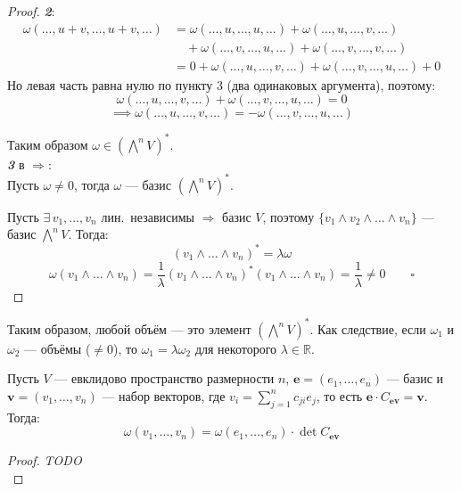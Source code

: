 \begin{stmt}
\begin{proof}
        \textbf{\emph{2}}:
        \begin{align*}
            \omega(\dots, u+v, \dots, u+v, \dots)
            &= \omega(\dots, u, \dots, u, \dots)
            + \omega(\dots, u, \dots, v, \dots) \\
            &\quad + \omega(\dots, v, \dots, u, \dots)
            + \omega(\dots, v, \dots, v, \dots) \\
            &= 0 + \omega(\dots, u, \dots, v, \dots)
            + \omega(\dots, v, \dots, u, \dots) + 0
        \end{align*}
        Но левая часть равна нулю по пункту 3 (два одинаковых аргумента), поэтому:
        \[
            \omega(\dots, u, \dots, v, \dots) + \omega(\dots, v, \dots, u, \dots) = 0
        \]
        \[
            \implies \omega(\dots, u, \dots, v, \dots) = -\omega(\dots, v, \dots, u, \dots) 
        \]

        Таким образом $\omega \in (\bigwedge^n V)^*$. \\


        \textbf{\emph{3}} в \textcircled{$\Rightarrow$}: \\
        Пусть $\omega \neq 0$, тогда
        $\omega$ --- базис $(\bigwedge^n V)^*$.

        Пусть $\exists\, v_1, \dots, v_n$ лин.\ независимы $\Rightarrow$ базис $V$,
        поэтому $\{v_1 \wedge v_2 \wedge \dots \wedge v_n\}$ --- базис $\bigwedge^n V$. Тогда:
        \[
            (v_1 \wedge \dots \wedge v_n)^* = \lambda\omega
        \]
        \[
            \omega(v_1 \wedge \dots \wedge v_n)
            = \frac{1}{\lambda}(v_1 \wedge \dots \wedge v_n)^*(v_1 \wedge \dots \wedge v_n)
            = \frac{1}{\lambda} \neq 0 \qquad \square
        \]

    \end{proof}
\end{stmt}



\begin{remark}
    Таким образом, любой объём --- это элемент $(\bigwedge^n V)^*$.
    Как следствие, если $\omega_1$ и $\omega_2$ --- объёмы ($\neq 0$), то
    $\omega_1 = \lambda \omega_2$ для некоторого $\lambda \in \mathbb{R}$.
\end{remark}


\begin{stmt}
    Пусть $V$ --- евклидово пространство размерности $n$,
    $\mathbf{e} = (e_1, \dots, e_n)$ --- базис и $\mathbf{v} = (v_1, \dots, v_n)$ --- набор векторов,
    где $v_i = \sum_{j=1}^{n} c_{ji} e_j$, то есть $\mathbf{e} \cdot C_{\mathbf{e}\mathbf{v}} = \mathbf{v}$. Тогда:
    \[
        \omega(v_1, \dots, v_n) = \omega(e_1, \dots, e_n) \cdot \det C_{\mathbf{e}\mathbf{v}}
    \]

    \begin{proof}
        \emph{TODO} \\
    \end{proof}
\end{stmt}